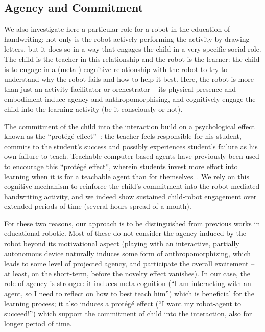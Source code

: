 \documentclass{article}
\begin{document}
\subsection{Agency and Commitment}

We also investigate here a particular role for a robot in the education of
handwriting: not only is the robot actively performing the activity by drawing
letters, but it does so in a way that engages the child in a very specific
social role. The child is the teacher in this relationship and the robot is the
learner: the child is to engage in a (meta-) cognitive relationship with the
robot to try to understand why the robot fails and how to help it best.  Here,
the robot is more than just an activity facilitator or orchestrator -- its
physical presence and embodiment induce agency and anthropomorphising, and
cognitively engage the child into the learning activity (be it consciously or
not).

The commitment of the child into the interaction build on a psychological effect
known as the ``protégé effect''~\cite{Chase2009}: the teacher feels responsible
for his student, commits to the student's success and possibly experiences
student's failure as his own failure to teach. Teachable computer-based agents
have previously been used to encourage this ``protégé effect'', wherein students
invest more effort into learning when it is for a teachable agent than for
themselves~\cite{Chase2009}.  We rely on this cognitive mechanism to reinforce
the child's commitment into the robot-mediated handwriting activity, and we
indeed show sustained child-robot engagement over extended periods of time
(several hours spread of a month).

For these two reasons, our approach is to be distinguished from previous works
in educational robotic. Most of these do not consider the agency induced by the
robot beyond its motivational aspect (playing with an interactive, partially
autonomous device naturally induces some form of anthropomorphizing, which leads
to some level of projected agency, and participate the overall excitement -- at
least, on the short-term, before the novelty effect vanishes).  In our case, the
role of agency is stronger: it induces meta-cognition (``I am interacting with
an agent, so I need to reflect on how to best teach him'') which is beneficial
for the learning process; it also induces a protégé effect (``I want my
robot-agent to succeed!'') which support the commitment of child into the
interaction, also for longer period of time.
\end{document}
